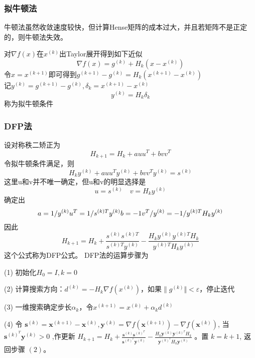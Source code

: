 \documentclass[12pt, a4paper, oneside]{ctexart}
\begin{document}
\subsubsection*{拟牛顿法}

牛顿法虽然收敛速度较快，但计算Hense矩阵的成本过大，并且若矩阵不是正定的，则牛顿法失效。

对$\nabla f(x)$在$x^{(k)}$出Taylor展开得到如下近似
$$
\nabla f(x) = g^{(k)} + H_{k}(x - x^{(k)})
$$
令$x = x^{(k+1)}$即可得到$g^{(k+1)} - g^{(k)}=H_{k}(x^{(k+1)}-x^{(k)})$\\
记$y^{(k)}= g^{(k+1)} - g^{(k)}, \delta _{k} = x^{(k+1)} - x^{(k)}$
$$
y^{(k)} = H_{k} \delta_{k}
$$
称为拟牛顿条件

\subsubsection*{DFP法}
设对称秩二矫正为
$$
H_{k+1} = H_{k} + auu^{T} + bvv^{T}
$$
令拟牛顿条件满足，则
$$
H_{k}y^{(k)} + auu^{T}y^{(k)} + bvv^{T}y^{(k)} = s^{(k)}
$$
这里u和v并不唯一确定，但u和v的明显选择是
$$
u = s^{(k)} \quad v = H_{k}y^{(k)}
$$
确定出
$$
a = 1 / y^{(k)}u^{T} = 1/s^{(k)T}y^{(k)}\\
b = -1v^{T}/y^{(k)} = - 1/y^{(k)T}H_{k}y^{(k)}
$$
因此
$$
H_{k+1} = H_{k} + \frac{s^{(k)}s^{(k)T}}{s^{(k)T}y^{(k)}} - \frac{H_{k}y^{(k)}y^{(k)T}H_{k}}{y^{(k)T}H_{k}y^{(k)}}
$$
这个公式称为DFP公式。
DFP法的运算步骤为
\begin{algorithm*}
    \caption{}
    \label{alg:algorithm}
    \BlankLine
    (1) 初始化$H_{0} = I, k = 0$

    (2) 计算搜索方向：$d^{(k)} = -H_{k} \nabla f(x^{(k)})$，如果$\| g^{(k)}\Vert < \varepsilon$，停止迭代

    (3) 一维搜索确定步长$\alpha_{k}$，令$x^{(k+1)} = x^{(k)} + \alpha_{k}d^{(k)}$

    (4) 令 $\mathbf{s}^{(k)}=\mathbf{x}^{(k+1)}-\mathbf{x}^{(k)}, \mathbf{y}^{(k)}=\nabla f\left(\mathbf{x}^{(k+1)}\right)-\nabla f\left(\mathbf{x}^{(k)}\right)$, 当 $\mathbf{s}^{(k)^T} \mathbf{y}^{(k)}>0$ ,作更新 $H_{k+1}=H_k+\frac{\mathbf{s}^{(k)} \mathbf{s}^{(k)^T}}{\mathbf{s}^{(k)^T} \mathbf{y}^{(k)}}-\frac{H_k \mathbf{y}^{(k)} \mathbf{y}^{(k){ }^T} H_k}{\mathbf{y}^{(k)^T} H_k \mathbf{y}^{(k)}}$ 。置 $k=k+1$, 返回步骤 $(2) 。$
\end{algorithm*}
\end{document}
